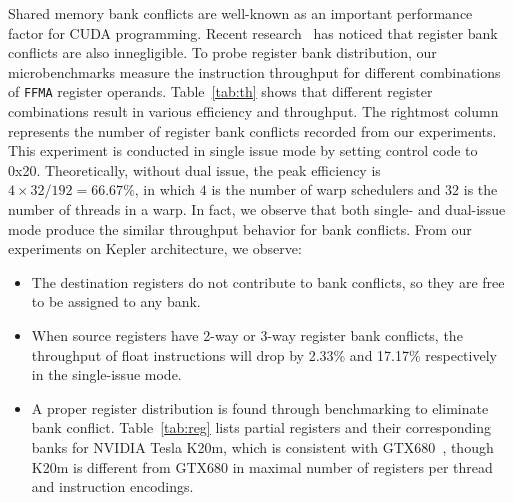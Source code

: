 Shared memory bank conflicts are well-known as an important performance factor for CUDA programming.
Recent research~\cite{lai} has noticed that register bank conflicts are also innegligible.
To probe register bank distribution, our microbenchmarks measure the instruction throughput for different combinations of {\tt FFMA} register operands.
Table~\ref{tab:th} shows that different register combinations result in various efficiency and throughput.
The rightmost column represents the number of register bank conflicts recorded from our experiments.
This experiment is conducted in single issue mode by setting control code to 0x20.
Theoretically, without dual issue, the peak efficiency is $4\times32/192=66.67\%$, in which $4$ is the number of warp schedulers and $32$
is the number of threads in a warp.
In fact, we observe that both single- and dual-issue mode produce the similar throughput behavior for bank conflicts.
From our experiments on Kepler architecture, we observe:
\begin{itemize}
\item The destination registers do not contribute to bank conflicts, so they are free to be assigned to any bank.%
\item When source registers have 2-way or 3-way register bank conflicts, the throughput of float instructions will drop by 2.33\% and 17.17\% respectively in the single-issue mode.
\item A proper register distribution is found through benchmarking to eliminate bank conflict.
     Table~\ref{tab:reg} lists partial registers and their corresponding banks for NVIDIA Tesla K20m, which is consistent with GTX680~\cite{lai}, though K20m is different from GTX680 in maximal number of registers per thread and instruction encodings.

\end{itemize}


